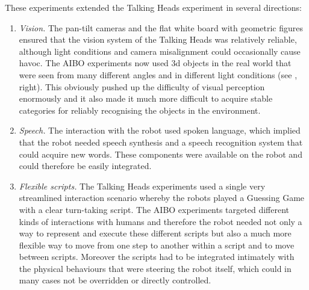 These experiments extended the Talking Heads experiment in several directions: 
\begin{enumerate}
\item {\itshape Vision.} The pan-tilt cameras and the flat white board with geometric figures ensured that the vision system 
of the Talking Heads was relatively reliable, although light conditions and camera misalignment
could occasionally 
cause havoc. The AIBO experiments now used 3d objects in the real world that were seen from many different 
angles and in different light conditions (see , right). This obviously pushed up the 
difficulty of visual perception enormously and it also made it much more difficult to acquire stable categories 
for reliably recognising the objects in the environment. 
\item {\itshape Speech.} The interaction with the robot used spoken language, which implied that the robot needed 
speech synthesis and a speech recognition system that could acquire new words. These components were available on the 
robot and could therefore be easily integrated. 
\item {\itshape Flexible scripts.} The Talking Heads experiments used a single very streamlined interaction scenario whereby
the robots played a Guessing Game with a clear turn-taking script. The AIBO experiments targeted different 
kinds of interactions with humans and therefore the robot needed not only a way to represent and execute these 
different scripts but also a much more flexible way to move from one step to another within a script and to move 
between scripts. Moreover the scripts had to be integrated intimately with the physical behaviours that were 
steering the robot itself, which could in many cases not be overridden or directly controlled. 
\end{enumerate}


